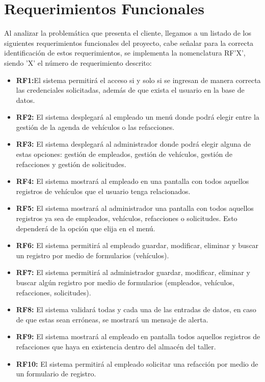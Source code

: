 \section{Requerimientos Funcionales}
Al analizar la problemática que presenta el cliente, llegamos a un listado de los siguientes requerimientos funcionales del proyecto, cabe señalar para la correcta identificación de estos requerimientos, se implementa la nomenclatura RF'X', siendo 'X' el número de requerimiento descrito: 
\begin{itemize}
	\item \textbf{RF1:}El sistema permitirá el acceso si y solo si se ingresan de manera correcta las credenciales solicitadas, además de que exista el usuario en la base de datos.
	\item \textbf{RF2:} El sistema desplegará al empleado un menú donde podrá elegir entre la gestión de la agenda de vehículos o las refacciones.
	\item \textbf{RF3:} El sistema desplegará al administrador donde podrá elegir alguna de estas opciones: gestión de empleados, gestión de vehículos, gestión de refacciones y gestión de solicitudes.
	\item \textbf{RF4:} El sistema mostrará al empleado en una pantalla con todos aquellos registros de vehículos que el usuario tenga relacionados.
	\item \textbf{RF5:} El sistema mostrará al administrador una pantalla con todos aquellos registros ya sea de empleados, vehículos, refacciones o solicitudes. Esto dependerá de la opción que elija en el menú. 
	\item \textbf{RF6:} El sistema permitirá al empleado guardar, modificar, eliminar y buscar un registro por medio de formularios (vehículos). 
	\item \textbf{RF7:} El sistema permitirá al administrador guardar, modificar, eliminar y buscar algún registro por medio de formularios (empleados, vehículos, refacciones, solicitudes).
	\item \textbf{RF8:} El sistema validará todas y cada una de las entradas de datos, en caso de que estas sean erróneas, se mostrará un mensaje de alerta. 
	\item \textbf{RF9:} El sistema mostrará al empleado en pantalla todos aquellos registros de refacciones que haya en existencia dentro del almacén del taller. 
	\item \textbf{RF10:} El sistema permitirá al empleado solicitar una refacción por medio de un formulario de registro. 
\end{itemize}